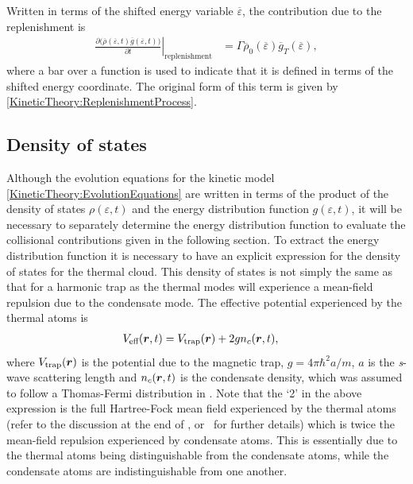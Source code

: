 Written in terms of the shifted energy variable $\overline{\varepsilon}$, the contribution due to the replenishment is
\begin{align}
    \left. \frac{\partial\big(\overline{\rho}(\overline{\varepsilon}, t) \overline{g}(\overline{\varepsilon}, t)\big)}{\partial t}\right|_\text{replenishment} &= \Gamma \overline{\rho}_0(\overline{\varepsilon}) \overline{g}_T(\overline{\varepsilon}),
    \label{MethodsAppendix:KineticTheory:ReplenishmentProcess}
\end{align}
where a bar over a function is used to indicate that it is defined in terms of the shifted energy coordinate.  The original form of this term is given by \eqref{KineticTheory:ReplenishmentProcess}.

\subsection{Density of states}
\label{MethodsAppendix:QKTDensityOfStates}

Although the evolution equations for the kinetic model \eqref{KineticTheory:EvolutionEquations} are written in terms of the product of the density of states $\rho(\varepsilon, t)$ and the energy distribution function $g(\varepsilon, t)$, it will be necessary to separately determine the energy distribution function to evaluate the collisional contributions given in the following section. To extract the energy distribution function it is necessary to have an explicit expression for the density of states for the thermal cloud. This density of states is not simply the same as that for a harmonic trap as the thermal modes will experience a mean-field repulsion due to the condensate mode. The effective potential experienced by the thermal atoms is
\begin{align}
    V_\text{eff}(\vect{r}, t) &= V_\text{trap}(\vect{r}) + 2 g n_c(\vect{r}, t), \label{MethodsAppendix:QKTEffectivePotential}
\end{align}
where $V_\text{trap}(\bm{r})$ is the potential due to the magnetic trap, $g = 4\pi \hbar^2 a/m$, $a$ is the \emph{s}-wave scattering length and $n_c(\bm{r}, t)$ is the condensate density, which was assumed to follow a Thomas-Fermi distribution in .  Note that the `2' in the above expression is the full Hartree-Fock mean field experienced by the thermal atoms (refer to the discussion at the end of , or~\citep[Chapter 8]{PethickSmith} for further details) which is twice the mean-field repulsion experienced by condensate atoms.  This is essentially due to the thermal atoms being distinguishable from the condensate atoms, while the condensate atoms are indistinguishable from one another.


